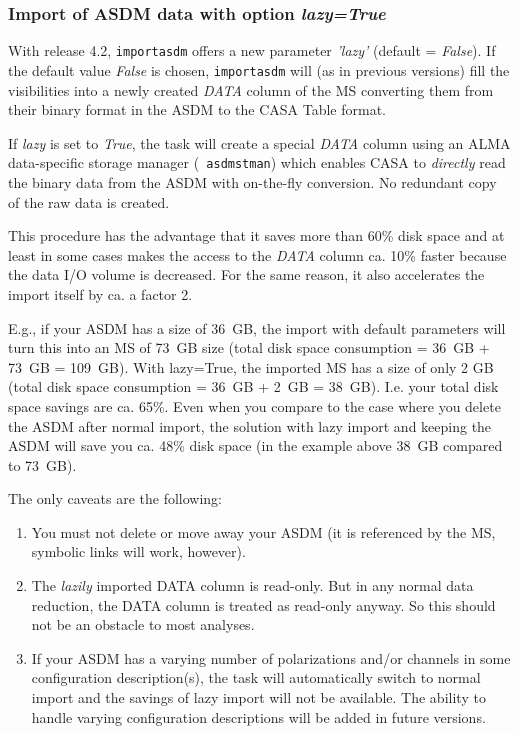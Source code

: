 \subsubsection{Import of ASDM data with option {\it lazy=True}}

With release 4.2, {\tt importasdm} offers a new parameter {\it 'lazy'}
(default = {\it False}).  If the default value {\it False} is chosen,
{\tt importasdm} will (as in previous versions) fill the visibilities
into a newly created {\it DATA} column of the MS converting them from their
binary format in the ASDM to the CASA Table format.

If {\it lazy} is set to {\it True}, the task will create a special
{\it DATA} column using an ALMA data-specific storage manager ({\tt
  asdmstman}) which enables CASA to {\it directly} read the binary
data from the ASDM with on-the-fly conversion.  No redundant copy of
the raw data is created.

This procedure has the advantage that it saves more than 60\% disk
space and at least in some cases makes the access to the {\it DATA} column
ca. 10\% faster because the data I/O volume is decreased.  For the
same reason, it also accelerates the import itself by ca. a factor 2.

E.g., if your ASDM has a size of 36~GB, the import with default
parameters will turn this into an MS of 73~GB size (total disk space
consumption = 36~GB + 73~GB = 109~GB).  With lazy=True, the imported
MS has a size of only 2 GB (total disk space consumption = 36~GB +
2~GB = 38~GB).  I.e. your total disk space savings are ca. 65\%. Even
when you compare to the case where you delete the ASDM after normal
import, the solution with lazy import and keeping the ASDM will save
you ca. 48\% disk space (in the example above 38~GB compared to
73~GB).

The only caveats are the following:
  \begin{enumerate}
  \item You must not delete or move away your ASDM (it is referenced by the MS, symbolic links will work, however).
  \item The {\it lazily} imported DATA column is read-only. But in any
    normal data reduction, the DATA column is treated as read-only
    anyway.  So this should not be an obstacle to most analyses.
  \item If your ASDM has a varying number of polarizations and/or channels in some configuration description(s),
          the task will automatically switch to normal import and the savings of lazy import will not be available.
          The ability to handle varying configuration descriptions will be added in future versions.
 \end{enumerate}

